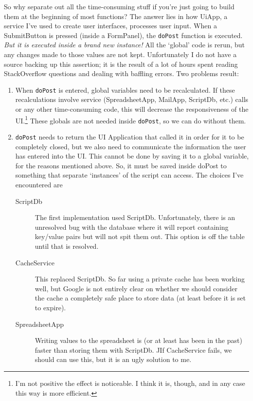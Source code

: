\documentclass{article}
\begin{document}
So why separate out all the time-consuming stuff if you're just going to build them at the beginning of most functions?
The answer lies in how UiApp, a service I've used to create user interfaces, processes user input.
When a SubmitButton is pressed (inside a FormPanel), the \texttt{doPost} function is executed.
\emph{But it is executed inside a brand new instance!}
All the `global' code is rerun, but any changes made to those values are not kept.
Unfortunately I do not have a source backing up this assertion; it is the result of a lot of hours spent reading StackOverflow questions and dealing with baffling errors.
Two problems result:
\begin{enumerate}
\item
When \texttt{doPost} is entered, global variables need to be recalculated.
If these recalculations involve service (SpreadsheetApp, MailApp, ScriptDb, etc.) calls or any other time-consuming code, this
will decrease the responsiveness of the UI.\footnote{%
I’m not positive the effect is noticeable.
I think it is, though, and in any case this way is more efficient.%
}
These globals are not needed inside \texttt{doPost}, so we can do without them.
\item
\texttt{doPost} needs to return the UI Application that called it in order for it to be completely closed, but we also need to communicate the information the user has entered into the UI.
This cannot be done by saving it to a global variable, for the reasons mentioned above.
So, it must be saved inside doPost to something that separate `instances' of the script can access.
The choices I've encountered are
\begin{description}
\item[ScriptDb]
The first implementation used ScriptDb.
Unfortunately, there is an unresolved bug with the database where it will report containing key/value pairs but will not spit them out.
This option is off the table until that is resolved.
\item[CacheService]
This replaced ScriptDb.
So far using a private cache has been working well, but Google is not entirely clear on whether we should consider the cache a completely safe place to store data (at least before it is set to expire).
\item[SpreadsheetApp]
Writing values to the spreadsheet is (or at least has been in the past) faster than storing them with ScriptDb.
JIf CacheService fails, we should can use this, but it is an ugly solution to me.
\end{description}
\end{enumerate}
\end{document}
